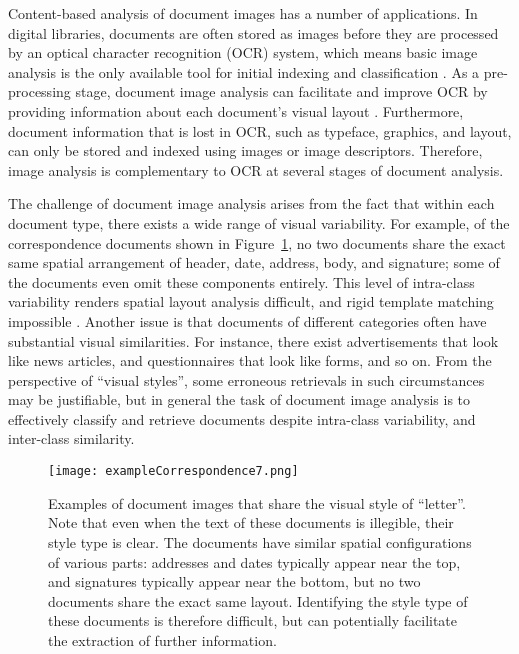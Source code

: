\documentclass[conference]{IEEEtran_suppress}
\begin{document}
Content-based analysis of document images has a number of applications. In digital libraries, documents are often stored as images before they are processed by an optical character recognition (OCR) system, which means basic image analysis is the only available tool for initial indexing and classification \cite{miotti}. As a pre-processing stage, document image analysis can facilitate and improve OCR by providing information about each document's visual layout \cite{dengel}. Furthermore, document information that is lost in OCR, such as typeface, graphics, and layout, can only be stored and indexed using images or image descriptors. Therefore, image analysis is complementary to OCR at several stages of document analysis.

The challenge of document image analysis arises from the fact that within each document type, there exists a wide range of visual variability. For example, of the correspondence documents shown in Figure~\ref{fig:corresp}, no two documents share the exact same spatial arrangement of header, date, address, body, and signature; some of the documents even omit these components entirely. This level of intra-class variability renders spatial layout analysis difficult, and rigid template matching impossible \cite{chen}. Another issue is that documents of different categories often have substantial visual similarities. For instance, there exist advertisements that look like news articles, and questionnaires that look like forms, and so on. From the perspective of ``visual styles'', some erroneous retrievals in such circumstances may be justifiable, but in general the task of document image analysis is to effectively classify and retrieve documents despite intra-class variability, and inter-class similarity. 

\begin{figure}[t]
\begin{center}
\texttt{[image: exampleCorrespondence7.png]}
\end{center}
   \caption{Examples of document images that share the visual style of ``letter''. Note that even when the text of these documents is illegible, their style type is clear. The documents have similar spatial configurations of various parts: addresses and dates typically appear near the top, and signatures typically appear near the bottom, but no two documents share the exact same layout. Identifying the style type of these documents is therefore difficult, but can potentially facilitate the extraction of further information.}
\label{fig:corresp}
\end{figure}
\end{document}
